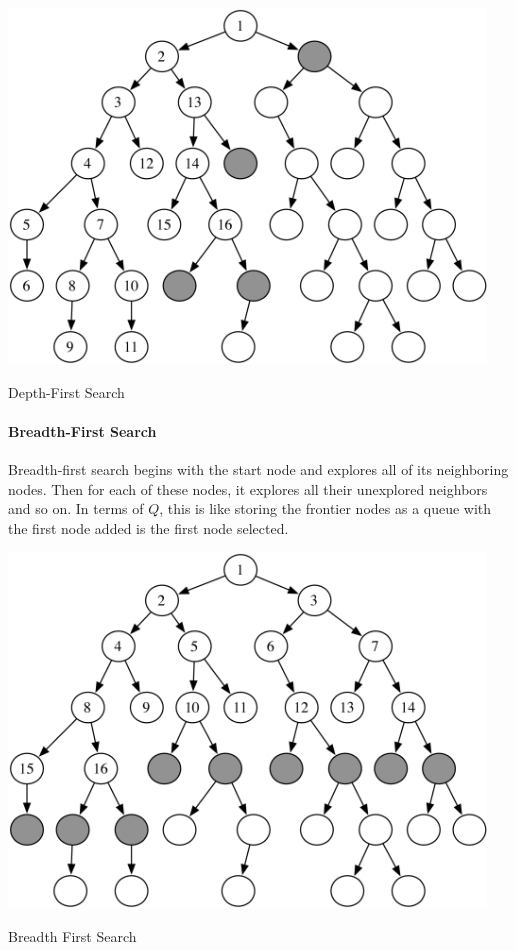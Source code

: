 \begin{marginfigure}
\begin{center}
\includegraphics[width=0.95\textwidth]{tex/figs/ch06_figs/depth_first.PNG}
\caption{Depth-First Search}
\end{center}
\end{marginfigure}

\paragraph{Breadth-First Search}
Breadth-first search begins with the start node and explores all of its neighboring nodes. Then for each of these nodes, it explores all their unexplored neighbors and so on. In terms of $Q$, this is like storing the frontier nodes as a queue with the first node added is the first node selected.

\begin{marginfigure}
\begin{center}
\includegraphics[width=0.95\textwidth]{tex/figs/ch06_figs/breadth_first.PNG}
\caption{Breadth First Search}
\end{center}
\end{marginfigure}


